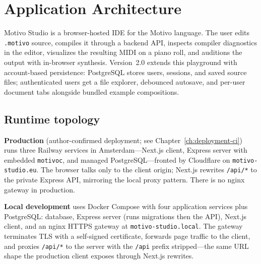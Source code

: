 \section{Application Architecture}\label{sec:studio-architecture}

Motivo Studio is a browser-hosted IDE for the Motivo language.
The user edits \texttt{.motivo} source, compiles it through a backend API, inspects compiler diagnostics in the
editor, visualizes the resulting MIDI on a piano roll, and auditions the output with in-browser synthesis.
Version~2.0 extends this playground with account-based persistence: PostgreSQL stores users, sessions, and saved
source files; authenticated users get a file explorer, debounced autosave, and per-user document tabs alongside
bundled example compositions.

\subsection{Runtime topology}\label{subsec:studio-runtime-topology}

\textbf{Production} (author-confirmed deployment; see Chapter~\ref{ch:deployment-ci}) runs three Railway services in
Amsterdam---Next.js client, Express server with embedded \texttt{motivoc}, and managed PostgreSQL---fronted by
Cloudflare on \texttt{motivo-studio.eu}.
The browser talks only to the client origin; Next.js rewrites \texttt{/api/*} to the private Express API, mirroring
the local proxy pattern.
There is no nginx gateway in production.

\textbf{Local development} uses Docker Compose with four application services plus PostgreSQL: database,
Express server (runs migrations then the API), Next.js client, and an nginx HTTPS gateway at
\texttt{motivo-studio.local}.
The gateway terminates TLS with a self-signed certificate, forwards page traffic to the client, and proxies
\texttt{/api/*} to the server with the \texttt{/api} prefix stripped---the same URL shape the production client
exposes through Next.js rewrites.

